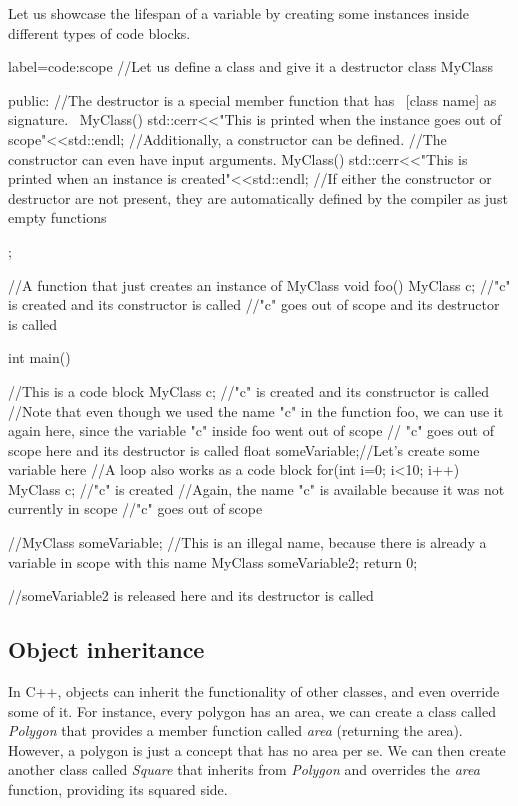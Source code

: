 \documentclass[ twoside,openright,titlepage,numbers=noenddot,%
headinclude,footinclude,cleardoublepage=empty,abstract=on,
BCOR=5mm,paper=b5,fontsize=11pt, dvipsnames
]{scrreprt}
\begin{document}
Let us showcase the lifespan of a variable by creating some instances inside different types of code blocks.
\begin{code2}{label=code:scope}
  //Let us define a class and give it a destructor
  class MyClass{

    public:
    //The destructor is a special member function that has ~[class name] as signature.
    ~MyClass(){
      std::cerr<<"This is printed when the instance goes out of scope"<<std::endl;
    }
    //Additionally, a constructor can be defined.
    //The constructor can even have input arguments.
    MyClass(){
      std::cerr<<"This is printed when an instance is created"<<std::endl;
    }
    //If either the constructor or destructor are not present, they are automatically defined by the compiler as just empty functions
  };

  //A function that just creates an instance of MyClass
  void foo(){
    MyClass c; //"c" is created and its constructor is called
  }//"c" goes out of scope and its destructor is called
  
  int main(){
    {//This is a code block
      MyClass c; //"c" is created and its constructor is called
      //Note that even though we used the name "c" in the function foo, we can use it again here, since the variable "c" inside foo went out of scope
    }// "c" goes out of scope here and its destructor is called
    float someVariable;//Let's create some variable here
    //A loop also works as a code block
    for(int i=0; i<10; i++){
      MyClass c; //"c" is created
      //Again, the name "c" is available because it was not currently in scope
    }//"c" goes out of scope

    //MyClass someVariable; //This is an illegal name, because there is already a variable in scope with this name
    MyClass someVariable2;
    return 0;
  }//someVariable2 is released here and its destructor is called
\end{code2}

\subsection*{Object inheritance}
In C++, objects can inherit the functionality of other classes, and even override some of it. For instance, every polygon has an area, we can create a class called \emph{Polygon} that provides a member function called \emph{area} (returning the area). However, a polygon is just a concept that has no area per se. We can then create another class called \emph{Square} that inherits from \emph{Polygon} and overrides the \emph{area} function, providing its squared side.
\end{document}
